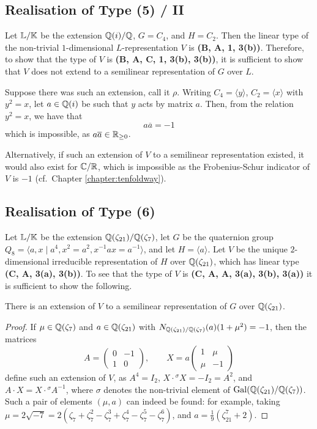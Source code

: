 \subsection{Realisation of Type (5) / II}

Let ${\mathbb L} / {\mathbb K}$ be the extension ${\mathbb Q}(i) / {\mathbb Q}$, $G = C_4$, and $H = C_2$. Then the linear type of the non-trivial $1$-dimensional $L$-representation $V$ is \textbf{(B, A, 1, 3(b))}. Therefore, to show that the type of $V$ is \textbf{(B, A, C, 1, 3(b), 3(b))}, it is sufficient to show that $V$ does not extend to a semilinear representation of $G$ over $L$.

Suppose there was such an extension, call it $\rho$. Writing $C_4 = \langle y \rangle$, $C_2 = \langle x \rangle$ with $y^2 = x$, let $a \in {\mathbb Q}(i)$ be such that $y$ acts by matrix $a$. Then, from the relation $y^2 = x$, we have that
\[
a \overline{a} = -1
\]
which is impossible, as $a \overline{a} \in {\mathbb R}_{\geq 0}$.

Alternatively, if such an extension of $V$ to a semilinear representation existed, it would also exist for ${\mathbb C} / {\mathbb R}$, which is impossible as the Frobenius-Schur indicator of $V$ is $-1$ (cf.\ Chapter \ref{chapter:tenfoldway}).

\subsection{Realisation of Type (6)}

Let ${\mathbb L} / {\mathbb K}$ be the extension ${\mathbb Q}(\zeta_{21}) / {\mathbb Q}(\zeta_7)$, let $G$ be the quaternion group $Q_8 = \langle a,x \mid a^4, x^2 = a^2, x^{-1}ax = a^{-1} \rangle$, and let $H = \langle a \rangle$. Let $V$ be the unique $2$-dimensional irreducible representation of $H$ over ${\mathbb Q}(\zeta_{21})$, which has linear type \textbf{(C, A, 3(a), 3(b))}. To see that the type of $V$ is \textbf{(C, A, A, 3(a), 3(b), 3(a))} it is sufficient to show the following. 

\begin{lemma}
    There is an extension of $V$ to a semilinear representation of $G$ over ${\mathbb Q}(\zeta_{21})$.
\end{lemma}

\begin{proof}
If $\mu \in {\mathbb Q}(\zeta_7)$ and $a \in {\mathbb Q}(\zeta_{21})$ with $N_{{\mathbb Q}(\zeta_{21}) / {\mathbb Q}(\zeta_{7})}(a)(1+\mu^2) = -1$, then the matrices
    \[
A = \begin{pmatrix}
    0 & -1 \\ 1 & 0
\end{pmatrix}, \qquad X = a \begin{pmatrix}
    1 & \mu \\ \mu & -1
\end{pmatrix}
\]
define such an extension of $V$, as $A^4 = I_2$, $X \cdot {}^{\sigma \!}X = - I_2 = A^2$, and $A \cdot X = X \cdot {}^{\sigma \!}A^{-1}$, where $\sigma$ denotes the non-trivial element of $\operatorname{Gal}({\mathbb Q}(\zeta_{21}) / {\mathbb Q}(\zeta_{7}))$. Such a pair of elements $(\mu, a)$ can indeed be found: for example, taking $\mu = 2 \sqrt{-7} = 2(\zeta_7 + \zeta_7^2 - \zeta_7^3 + \zeta_7^4 - \zeta_7^5 - \zeta_7^6)$, and $a = \frac{1}{9}(\zeta_{21}^7 + 2)$.
\end{proof}

